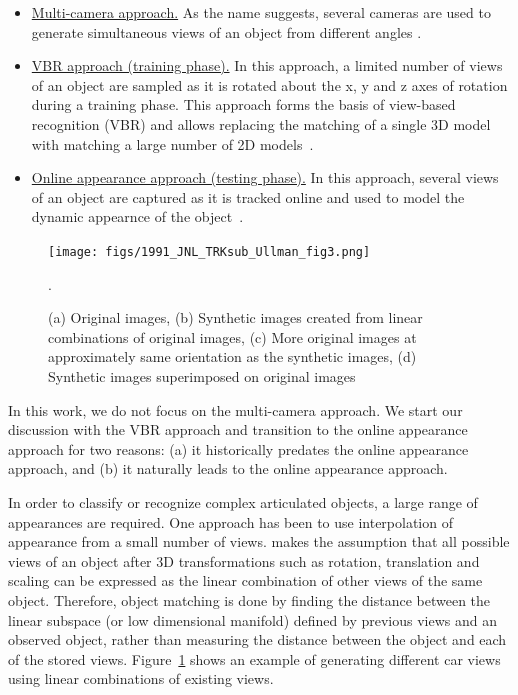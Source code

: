 \begin{itemize}
\item \underline{Multi-camera approach.}  As the name suggests, several cameras are used to generate simultaneous views of an object from different angles \cite{2000_JNL_EasyLiv_Krumm}.  
\item \underline{VBR approach (training phase).}  In this approach, a limited number of views of an object are sampled as it is rotated about the x, y and z axes of rotation during a training phase.  This approach forms the basis of view-based recognition (VBR) and allows replacing the matching of a single 3D model with matching a large number of 2D models~\cite{1992_JNL_VBR_Breuel, 1993_CNF_Gestures_Darrell}.
\item \underline{Online appearance approach (testing phase).}  In this approach, several views of an object are captured as it is tracked online and used to model the dynamic appearnce of the object~\cite{2008_JNL_subspaceTRK_Ross}.
\end{itemize}
								\begin{figure}[t]
								\center
								\texttt{[image: figs/1991\_JNL\_TRKsub\_Ullman\_fig3.png]}
								\caption{(a) Original images, (b) Synthetic images created from linear combinations of original images, (c) More original images at approximately same orientation as the synthetic images, (d) Synthetic images superimposed on original images~\cite{1991_JNL_Recog_Ullman}}.
								\label{fig:1991_JNL_TRKsub_Ullman_fig3}
								\end{figure}

In this work, we do not focus on the multi-camera approach.  We start our discussion with the VBR approach and transition to the online appearance approach for two reasons: (a) it historically predates the online appearance approach, and (b) it naturally leads to the online appearance approach.

In order to classify or recognize complex articulated objects, a large range of appearances are required.  One approach has been to use interpolation of appearance from a small number of views.  \cite{1991_JNL_Recog_Ullman} makes the assumption that all possible views of an object after 3D transformations such as rotation, translation and scaling can be expressed as the linear combination of other views of the same object.  Therefore, object matching is done by finding the distance between the linear subspace (or low dimensional manifold) defined by previous views and an observed object, rather than measuring the distance between the object and each of the stored views.  Figure~\ref{fig:1991_JNL_TRKsub_Ullman_fig3} shows an example of generating different car views using linear combinations of existing views.  



